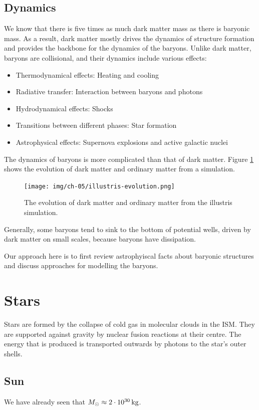 \subsection{Dynamics}
We know that there is five times as much dark matter mass as there is baryonic mass.
As a result, dark matter mostly drives the dynamics of structure formation and provides the backbone for the dynamics of the baryons.
Unlike dark matter, baryons are collisional, and their dynamics include various effects:
\begin{itemize}
	\item Thermodynamical effects: Heating and cooling
	\item Radiative transfer: Interaction between baryons and photons
	\item Hydrodynamical effects: Shocks
	\item Transitions between different phases: Star formation
	\item Astrophysical effects: Supernova explosions and active galactic nuclei
\end{itemize}
The dynamics of baryons is more complicated than that of dark matter.
Figure \ref{fig:illustris-evolution} shows the evolution of dark matter and ordinary matter from a simulation.

\begin{figure}
	\texttt{[image: img/ch-05/illustris-evolution.png]}
	\caption{The evolution of dark matter and ordinary matter from the illustris simulation.}
	\label{fig:illustris-evolution}
\end{figure}

Generally, some baryons tend to sink to the bottom of potential wells, driven by dark matter on small scales, because baryons have dissipation.

Our approach here is to first review astrophyiscal facts about baryonic structures and discuss approaches for modelling the baryons.





\section{Stars}

Stars are formed by the collapse of cold gas in molecular clouds in the ISM.
They are supported against gravity by nuclear fusion reactions at their centre.
The energy that is produced is transported outwards by photons to the star's outer shells.

\subsection{Sun}
We have already seen that $M_\sol \approx \SI{2e30}{\kg}$.



